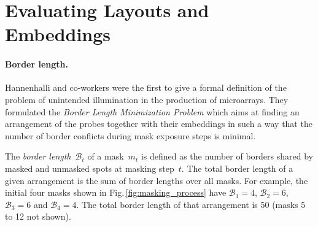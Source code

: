 \documentclass{llncs}
\begin{document}

\section{Evaluating Layouts and Embeddings}
\label{sec:eval}

\paragraph{Border length.}
Hannenhalli and co-workers \cite{HANNENHALLI02} were the first to give a
formal definition of the problem of unintended illumination in the production
of microarrays. They formulated the \emph{Border Length Minimization Problem}
which aims at finding an arrangement of the probes together with their
embeddings in such a way that the number of border conflicts during mask
exposure steps is minimal.

The \emph{border length}~$\mathcal{B}_t$ of a mask~$m_{t}$ is defined as the
number of borders shared by masked and unmasked spots at masking step~$t$. The
total border length of a given arrangement is the sum of border lengths over
all masks. For example, the initial four masks shown in
Fig.\,\ref{fig:masking_process} have $\mathcal{B}_1 = 4$, $\mathcal{B}_2 = 6$,
$\mathcal{B}_3 = 6$ and $\mathcal{B}_4 = 4$.  The total border length of that
arrangement is 50 (masks 5 to 12 not shown).
\end{document}
